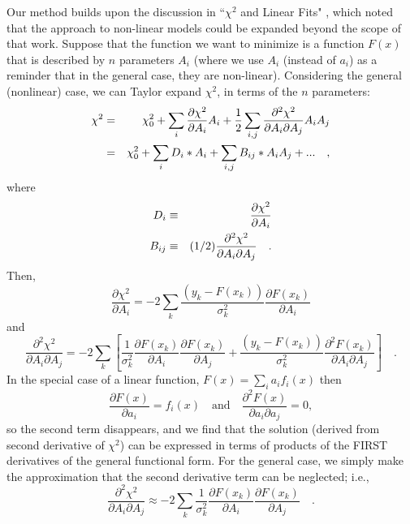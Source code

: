 \documentclass[preprint]{aastex631}
\begin{document}
Our method builds upon the discussion in ``$\chi^2$ and Linear Fits" \citep{Gould03}, which noted that the approach to non-linear models could be expanded beyond the scope of that work. Suppose that the function we want to minimize is a function $F(x)$ that is described by $n$ parameters $A_i$ (where we use $A_i $ (instead of $a_i$) as a reminder that in the general
case, they are non-linear). Considering
the general (nonlinear) case, we can Taylor expand $\chi^2$, in terms of the $n$ parameters:
\begin{eqnarray}
\chi^2 & = &  \chi^2_0 + \sum_i {\partial \chi^2\over \partial A_i} A_i
+ {1\over2}\sum_{i,j} {\partial^2 \chi^2\over \partial A_i \partial A_j}A_i A_j\\
& = & \chi^2_0 + \sum_i D_i * A_i + \sum_{i,j} B_{ij} * A_i A_j  + ... \quad,
\end{eqnarray}
where
\begin{eqnarray}
D_i  & \equiv & {\partial \chi^2\over \partial A_i} \label{eqn:d}\\
B_{ij} & \equiv & (1/2){\partial^2 \chi^2\over \partial A_i\partial A_j}  \quad. \label{eqn:b}
\end{eqnarray}
Then,
\begin{equation}
\frac{\partial \chi^2}{\partial A_i} = -2\sum_k \frac{(y_k - F(x_k))}{\sigma^2_k}\frac{\partial F(x_k)}{\partial A_i}
\end{equation}
and
\begin{equation}
\frac{\partial^2 \chi^2}{\partial A_i \partial A_j} = -2\sum_k \left[
 \frac{1}{\sigma^2_k}\frac{\partial F(x_k)}{\partial A_i}\frac{\partial F(x_k)}{\partial A_j} +
  \frac{(y_k - F(x_k))}{\sigma^2_k}\frac{\partial^2 F(x_k)}{\partial A_i \partial A_j}
 \right] \quad .
\end{equation}
In the special case of a linear function, $F(x) = \sum_i a_i f_i(x)$
then
\begin{equation}
\frac{\partial F(x)}{\partial a_i} = f_i(x)
\quad \mathrm{and} \quad
\frac{\partial^2 F(x)}{\partial a_i\partial a_j} = 0,
\end{equation}
so the second term disappears, and we find that the solution (derived from
second derivative of $\chi^2$) can be expressed
in terms of products of the FIRST derivatives of the general functional
form.  For the general case, we simply make the approximation that the second derivative term can be neglected; i.e.,
\begin{equation}
\frac{\partial^2 \chi^2}{\partial A_i \partial A_j} \approx -2\sum_k 
 \frac{1}{\sigma^2_k}\frac{\partial F(x_k)}{\partial A_i}\frac{\partial F(x_k)}{\partial A_j} \quad.
\end{equation}
\end{document}
